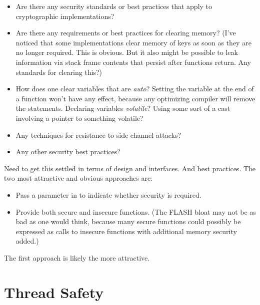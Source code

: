 \begin{itemize}
\item Are there any security standards or best practices
      that apply to cryptographic implementations?
\item Are there any requirements or best practices for 
      clearing memory? (I've noticed
      that some implementations clear memory of
      keys as soon as they
      are no longer required.  This is obvious.
      But it also might be
      possible to leak information via stack frame
      contents that persist
      after functions return.  Any standards for
      clearing this?)
\item How does one clear variables that are \emph{auto}?
      Setting the variable at the end of a function won't 
      have any effect, because any optimizing compiler will 
      remove the statements.  Declaring variables 
      \emph{volatile}?  Using some sort of a cast involving 
      a pointer to something volatile?
\item Any techniques for resistance to side channel 
      attacks?
\item Any other security best practices?
\end{itemize}

Need to get this settled in terms of design and interfaces.
And best practices.
The two most attractive and obvious approaches are:

\begin{itemize}
\item Pass a parameter in to indicate whether security
      is required.
\item Provide both secure and insecure functions.  (The
      FLASH bloat may not be as bad as one would think,
      because many secure functions could possibly
      be 
      expressed as calls to insecure functions with 
      additional memory security added.)
\end{itemize}

The first approach is likely the more attractive.


\section{Thread Safety}
\label{cldd0:stsf0}

